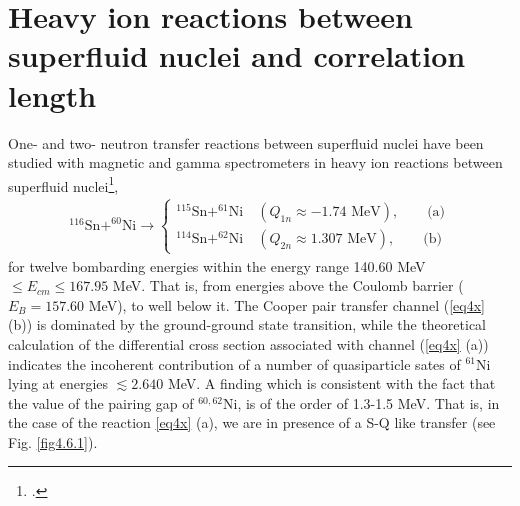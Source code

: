   \FloatBarrier
\section[Heavy ion reactions  and correlation length]{Heavy ion reactions between superfluid nuclei and correlation length}\label{S7.3}
One- and two- neutron transfer reactions between superfluid nuclei have been studied with magnetic and gamma spectrometers  in heavy ion reactions between superfluid nuclei\footnote{\cite{Montanari:14,Montanari:16}.},
\begin{align}\label{eq4x}
^{116}\text{Sn}+^{60}\text{Ni}\to\left\{\begin{array}{c}
^{115}\text{Sn}+^{61}\text{Ni}\quad (Q_{1n}\approx -1.74\text{ MeV}),\quad\quad\text{(a)} \\ [10pt]
^{114}\text{Sn}+^{62}\text{Ni}\quad (Q_{2n}\approx 1.307\text{ MeV}),\quad\quad\text{(b)}
\end{array} \right.
\end{align}
for twelve bombarding energies within the energy range 140.60 MeV$\leq E_{cm}\leq167.95$ MeV. That is, from energies above the Coulomb barrier ($E_B=157.60$ MeV), to well below it. The Cooper pair transfer channel (\ref{eq4x} (b)) is dominated by the ground-ground state transition, while the theoretical calculation of the differential cross section associated with channel (\ref{eq4x} (a)) indicates the incoherent contribution of a number of quasiparticle sates of $^{61}$Ni lying at energies $\lesssim 2.640$ MeV. A finding  which is consistent with the fact that the value of the pairing gap of $^{60,62}$Ni, is of the order of 1.3-1.5 MeV. That is, in the case of the reaction \ref{eq4x} (a), we are in presence of a  S-Q like transfer (see Fig. \ref{fig4.6.1}).	
